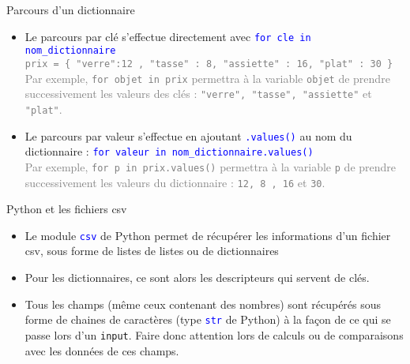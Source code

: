 \documentclass[10pt]{beamer}
\begin{document}
\begin{frame}
	\mframe{\DB}
	\begin{alertblock}{Parcours d'un dictionnaire}
		\begin{itemize}
			\item<1-> Le parcours par clé s'effectue directement avec \textcolor{blue}{\tt for cle in nom\_dictionnaire}\\
			      \onslide<2->\textcolor{gray}{{\tt prix = \{ "verre":12 , "tasse" : 8, "assiette" : 16, "plat" : 30 \} } \\
			      Par exemple, {\tt for objet in prix} permettra à la variable {\tt objet} de prendre successivement les valeurs des clés : {\tt "verre", "tasse", "assiette"} et {\tt "plat"}.}
			\item<3-> Le parcours par valeur s'effectue en ajoutant \textcolor{blue}{\tt .values()} au nom du dictionnaire : \textcolor{blue}{\tt for valeur in nom\_dictionnaire.values() \\}
			      \onslide<4->\textcolor{gray}{
			      Par exemple, {\tt for p in prix.values()} permettra à la variable {\tt p} de prendre successivement les valeurs du dictionnaire : {\tt 12, 8 , 16} et {\tt 30}.
			      }
		\end{itemize}
	\end{alertblock}
\end{frame}



\begin{frame}
	\mframe{\DB}
	\begin{block}{Python et les fichiers csv}
		\begin{itemize}
			\item<1-> Le module \textcolor{blue}{\tt csv} de Python permet de récupérer les informations d'un fichier csv, sous forme de listes de listes ou de dictionnaires
			\item<2-> Pour les dictionnaires, ce sont alors les  descripteurs qui servent de clés.
			\item<3-> Tous les champs (même ceux contenant des nombres) sont récupérés sous forme de chaines de caractères (type \textcolor{blue}{\tt str} de Python) à la façon de ce qui se passe lors d'un {\tt input}. Faire donc attention lors de calculs ou de comparaisons avec les données de ces champs.
		\end{itemize}
	\end{block}
\end{frame}
\end{document}

